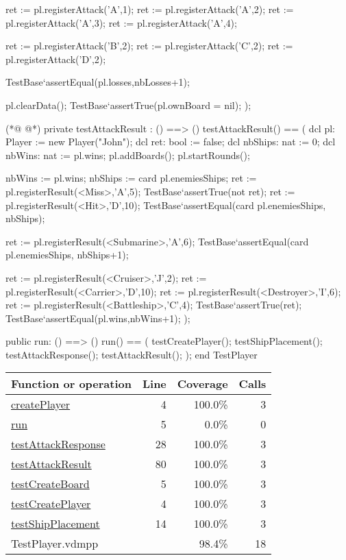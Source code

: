 \begin{vdmpp}[breaklines=true]
   ret := pl.registerAttack('A',1);
   ret := pl.registerAttack('A',2);
    ret := pl.registerAttack('A',3);
   ret := pl.registerAttack('A',4);
   
   ret := pl.registerAttack('B',2);
   ret := pl.registerAttack('C',2);
   ret := pl.registerAttack('D',2);
   
   TestBase`assertEqual(pl.losses,nbLosses+1);
   
   pl.clearData();
   TestBase`assertTrue(pl.ownBoard = nil);
 );
 
(*@
\label{testAttackResult:80}
@*)
 private testAttackResult : () ==> ()
  testAttackResult() == (
   dcl pl: Player := new Player("John");
   dcl ret: bool := false;
   dcl nbShips: nat := 0;
   dcl nbWins: nat := pl.wins;
   pl.addBoards();
   pl.startRounds();
   
   nbWins := pl.wins;
   nbShips := card pl.enemiesShips;
   ret := pl.registerResult(<Miss>,'A',5);
   TestBase`assertTrue(not ret);
   ret := pl.registerResult(<Hit>,'D',10);
   TestBase`assertEqual(card pl.enemiesShips, nbShips);
   
   ret := pl.registerResult(<Submarine>,'A',6);
   TestBase`assertEqual(card pl.enemiesShips, nbShips+1);
   
   ret := pl.registerResult(<Cruiser>,'J',2);
   ret := pl.registerResult(<Carrier>,'D',10);
   ret := pl.registerResult(<Destroyer>,'I',6);
   ret := pl.registerResult(<Battleship>,'C',4);
   TestBase`assertTrue(ret);
   TestBase`assertEqual(pl.wins,nbWins+1);
 );
 
 public run: () ==> ()
  run() == (
   testCreatePlayer();
   testShipPlacement();
   testAttackResponse();
   testAttackResult();
 );
end TestPlayer
\end{vdmpp}
\bigskip
\begin{longtable}{|l|r|r|r|}
\hline
Function or operation & Line & Coverage & Calls \\
\hline
\hline
\hyperref[createPlayer:4]{createPlayer} & 4&100.0\% & 3 \\
\hline
\hyperref[run:5]{run} & 5&0.0\% & 0 \\
\hline
\hyperref[testAttackResponse:28]{testAttackResponse} & 28&100.0\% & 3 \\
\hline
\hyperref[testAttackResult:80]{testAttackResult} & 80&100.0\% & 3 \\
\hline
\hyperref[testCreateBoard:5]{testCreateBoard} & 5&100.0\% & 3 \\
\hline
\hyperref[testCreatePlayer:4]{testCreatePlayer} & 4&100.0\% & 3 \\
\hline
\hyperref[testShipPlacement:14]{testShipPlacement} & 14&100.0\% & 3 \\
\hline
\hline
TestPlayer.vdmpp & & 98.4\% & 18 \\
\hline
\end{longtable}

